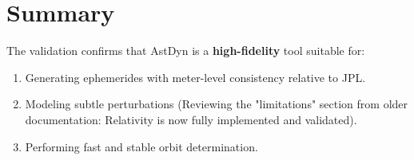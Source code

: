 \section{Summary}
The validation confirms that AstDyn is a \textbf{high-fidelity} tool suitable for:
\begin{enumerate}
    \item Generating ephemerides with meter-level consistency relative to JPL.
    \item Modeling subtle perturbations (Reviewing the "limitations" section from older documentation: Relativity is now fully implemented and validated).
    \item Performing fast and stable orbit determination.
\end{enumerate}
